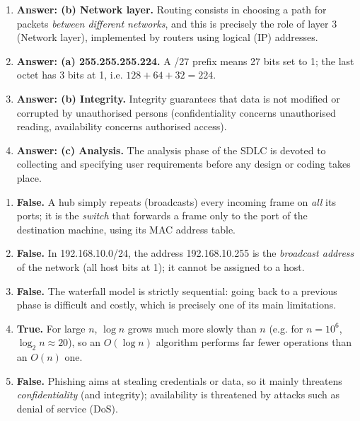 \documentclass[11pt]{article}
\begin{document}
\begin{corrige}
\begin{enumerate}
\item \textbf{Answer: (b) Network layer.} Routing consists in choosing a path for packets \emph{between different networks}, and this is precisely the role of layer 3 (Network layer), implemented by routers using logical (IP) addresses.
\item \textbf{Answer: (a) 255.255.255.224.} A /27 prefix means 27 bits set to 1; the last octet has 3 bits at 1, i.e. $128+64+32=224$.
\item \textbf{Answer: (b) Integrity.} Integrity guarantees that data is not modified or corrupted by unauthorised persons (confidentiality concerns unauthorised reading, availability concerns authorised access).
\item \textbf{Answer: (c) Analysis.} The analysis phase of the SDLC is devoted to collecting and specifying user requirements before any design or coding takes place.
\end{enumerate}
\end{corrige}

\begin{corrige}
\begin{enumerate}
\item \textbf{False.} A hub simply repeats (broadcasts) every incoming frame on \emph{all} its ports; it is the \emph{switch} that forwards a frame only to the port of the destination machine, using its MAC address table.
\item \textbf{False.} In 192.168.10.0/24, the address 192.168.10.255 is the \emph{broadcast address} of the network (all host bits at 1); it cannot be assigned to a host.
\item \textbf{False.} The waterfall model is strictly sequential: going back to a previous phase is difficult and costly, which is precisely one of its main limitations.
\item \textbf{True.} For large $n$, $\log n$ grows much more slowly than $n$ (e.g. for $n=10^6$, $\log_2 n \approx 20$), so an $O(\log n)$ algorithm performs far fewer operations than an $O(n)$ one.
\item \textbf{False.} Phishing aims at stealing credentials or data, so it mainly threatens \emph{confidentiality} (and integrity); availability is threatened by attacks such as denial of service (DoS).
\end{enumerate}
\end{corrige}
\end{document}
